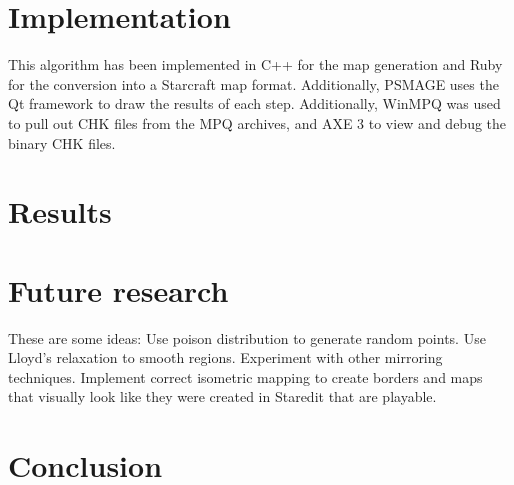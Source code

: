 \documentclass[letterpaper]{article}
\begin{document}


\section{Implementation} %
\label{sec:implementation}
This algorithm has been implemented in C++ for the map generation and Ruby for the conversion into a Starcraft map format. Additionally, PSMAGE uses the Qt framework to draw the results of each step. Additionally, WinMPQ was used to pull out CHK files from the MPQ archives, and AXE 3 to view and debug the binary CHK files.



\section{Results} %
\label{sec:results}



\section{Future research} %
\label{sec:future_research}
These are some ideas:
Use poison distribution to generate random points.
Use Lloyd's relaxation to smooth regions.
Experiment with other mirroring techniques.
Implement correct isometric mapping to create borders and maps that visually look like they were created in Staredit that are playable.


\section{Conclusion} %
\label{sec:conclusion}





\end{document}
